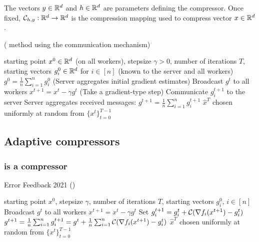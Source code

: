 \documentclass[nohyperref]{article}
\theoremstyle{plain}
\theoremstyle{definition}
\theoremstyle{remark}
\begin{document}
The vectors $y \in \mathbb R^d$ and $h \in \mathbb R^d$ are parameters defining the compressor. Once fixed, $\mathcal{C}_{h,y}:\mathbb R^d \to \mathbb R^d$ is the  compression mapping used to compress vector $x\in \mathbb R^d$. %

\begin{algorithm*}[!h]
   \caption{ ( method using the  communication mechanism)}\label{alg:3PC}
\begin{algorithmic}[1]
    starting point $x^0\in \mathbb R^d$ (on all workers), stepsize $\gamma>0$, number of iterations $T$, starting vectors $g_i^0\in \mathbb R^d$ for $i \in [n]$ (known to the server and all workers)
     $g^0 = \frac{1}{n}\sum_{i=1}^n g_i^0$ \hfill (Server aggregates initial gradient estimates)
   \STATE Broadcast $g^t$ to all workers      
   \STATE $x^{t+1} = x^t - \gamma g^t$ \hfill (Take a gradient-type step)
   \STATE Communicate $g_i^{t+1}$ to the server    
   \ENDFOR
   \STATE Server aggregates received messages: $g^{t+1} = \tfrac{1}{n}\sum_{i=1}^n g_i^{t+1} $ 
   \ENDFOR
    $\hat x^T$ chosen uniformly at random from $\{x^t\}_{t=0}^{T-1}$
\end{algorithmic}
\end{algorithm*}

\subsection{Adaptive compressors}



\subsubsection{ is a  compressor}

\begin{algorithm}[!h]
   \caption{Error Feedback 2021 ()}\label{alg:b_diana}
\begin{algorithmic}[1]
    starting point $x^0$, stepsize $\gamma$, number of iterations $T$, starting vectors $g_i^0$, $i \in [n]$
   \STATE Broadcast $g^t$ to all workers
   \STATE $x^{t+1} = x^t - \gamma g^t$
   \STATE Set $g_i^{t+1} = g_i^t + \mathcal{C}(\nabla f_i(x^{t+1}) - g_i^t)$ 
   \ENDFOR
   \STATE $g^{t+1} = \tfrac{1}{n}\sum_{i=1}^ng_i^{t+1} = g^t + \tfrac{1}{n}\sum_{i=1}^n \mathcal{C}(\nabla f_i(x^{t+1}) - g_i^t)$
   \ENDFOR
    $\hat x^T$ chosen uniformly at random from $\{x^t\}_{t=0}^{T-1}$
\end{algorithmic}
\end{algorithm}
\end{document}
